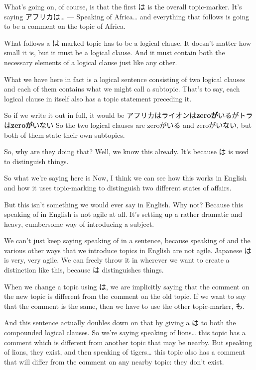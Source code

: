 What's going on, of course, is that the first は is the overall topic-marker. It's saying アフリカは\ldots{} --- Speaking of Africa\ldots{} and everything that follows is going to be a comment on the topic of Africa.

What follows a は-marked topic has to be a logical clause. It doesn't matter how small it is, but it must be a logical clause. And it must contain both the necessary elements of a logical clause just like any other.

What we have here in fact is a logical sentence consisting of two logical clauses and each of them contains what we might call a subtopic. That's to say, each logical clause in itself also has a topic statement preceding it.

So if we write it out in full, it would be アフリカはライオンは{\bf zeroが}いるがトラは{\bf zeroが}いない So the two logical clauses are zeroがいる and zeroがいない, but both of them state their own subtopics.

{}

So, why are they doing that? Well, we know this already. It's because は is used to distinguish things.

So what we're saying here is  Now, I think we can see how this works in English and how it uses topic-marking to distinguish two different states of affairs.

But this isn't something we would ever say in English. Why not? Because this speaking of in English is not agile at all. It's setting up a rather dramatic and heavy, cumbersome way of introducing a subject.

We can't just keep saying speaking of in a sentence, because speaking of and the various other ways that we introduce topics in English are not agile. Japanese は is very, very agile. We can freely throw it in wherever we want to create a distinction like this, because は distinguishes things.

When we change a topic using は, we are implicitly saying that the comment on the new topic is different from the comment on the old topic. If we want to say that the comment is the same, then we have to use the other topic-marker, も.

{}

And this sentence actually doubles down on that by giving a は to both the compounded logical clauses. So we're saying speaking of lions\ldots{} this topic has a comment which is different from another topic that may be nearby. But speaking of lions, they exist, and then speaking of tigers\ldots{} this topic also has a comment that will differ from the comment on any nearby topic: they don't exist.

